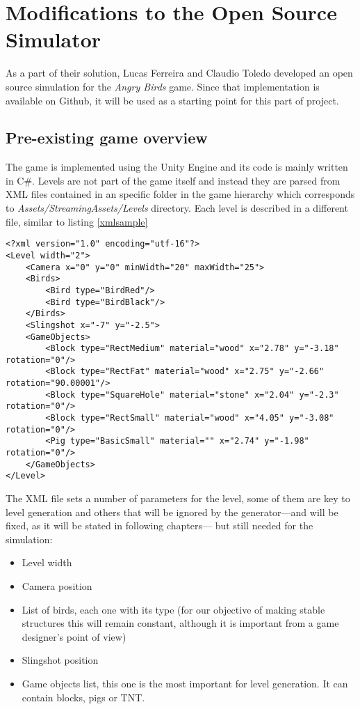 \chapter{Modifications to the Open Source Simulator}\label{ch:gameApdaptation}
As a part of their solution, Lucas Ferreira and Claudio Toledo\cite{ferreira2014search} developed an open source simulation for the \textit{Angry Birds} game. Since that implementation is available on Github, it will be used as a starting point for this part of project.

\section{Pre-existing game overview}
The game is implemented using the Unity Engine and its code is mainly written in C\#. Levels are not part of the game itself and instead they are parsed from XML files contained in an specific folder in the game hierarchy which corresponds to \textit{Assets/StreamingAssets/Levels} directory. Each level is described in a different file, similar to listing \ref{xmlsample}
\lstset{language=XML}
\begin{lstlisting}[caption=Sample level input to show format, label=xmlsample]
<?xml version="1.0" encoding="utf-16"?>
<Level width="2">
	<Camera x="0" y="0" minWidth="20" maxWidth="25">
	<Birds>
		<Bird type="BirdRed"/>
		<Bird type="BirdBlack"/>
	</Birds>
	<Slingshot x="-7" y="-2.5">
	<GameObjects>
		<Block type="RectMedium" material="wood" x="2.78" y="-3.18" rotation="0"/>
		<Block type="RectFat" material="wood" x="2.75" y="-2.66" rotation="90.00001"/>
		<Block type="SquareHole" material="stone" x="2.04" y="-2.3" rotation="0"/>
		<Block type="RectSmall" material="wood" x="4.05" y="-3.08" rotation="0"/>
		<Pig type="BasicSmall" material="" x="2.74" y="-1.98" rotation="0"/>
	</GameObjects>
</Level>
\end{lstlisting}
The XML file sets a number of parameters for the level, some of them are key to level generation and others that will be ignored by the generator---and will be fixed, as it will be stated in following chapters--- but still needed for the simulation:
\begin{itemize}
	\item Level width 
	\item Camera position
	\item List of birds, each one with its type (for our objective of making stable structures this will remain constant, although it is important from a game designer's point of view)
	\item Slingshot position
	\item Game objects list, this one is the most important for level generation. It can contain blocks, pigs or TNT.
\end{itemize}

